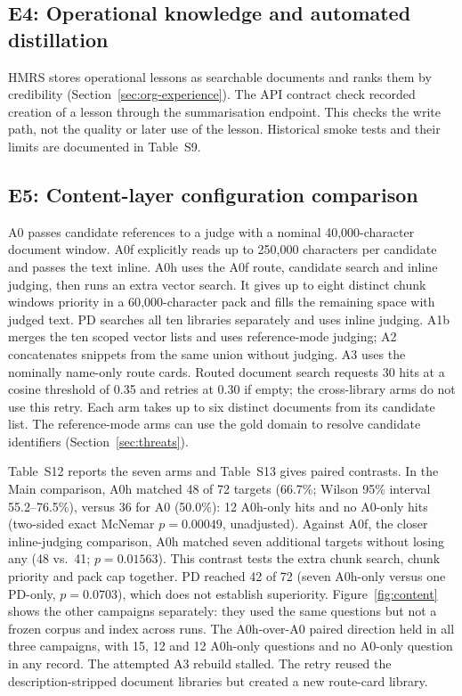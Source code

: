 \subsection{E4: Operational knowledge and automated distillation}
\label{sec:e3}
HMRS stores operational lessons as searchable documents and ranks them by
credibility (Section~\ref{sec:org-experience}). The API contract
check recorded creation of a lesson through the summarisation endpoint.
This checks the write path, not the quality or later use of the lesson.
Historical smoke tests and their limits are documented in Table~S9.

\subsection{E5: Content-layer configuration comparison}
\label{sec:ladder-opt}
A0 passes candidate references to a judge with a nominal
40{,}000-character document window. A0f explicitly reads up to 250{,}000
characters per candidate and passes the text inline. A0h uses the A0f
route, candidate search and inline judging, then runs an extra vector
search. It gives up to eight distinct chunk windows priority in a
60{,}000-character pack and fills the remaining space with judged text.
PD searches all ten libraries separately and uses inline judging. A1b
merges the ten scoped vector lists and uses reference-mode judging; A2
concatenates snippets from the same union without judging. A3 uses the
nominally name-only route cards. Routed document search requests 30 hits at
a cosine threshold of 0.35 and retries at 0.30 if empty; the cross-library
arms do not use this retry. Each arm takes up to six distinct documents
from its candidate list. The reference-mode arms can use the gold domain
to resolve candidate identifiers (Section~\ref{sec:threats}).

Table~S12 reports the seven arms and Table~S13 gives paired contrasts.
In the Main comparison, A0h matched 48 of 72 targets (66.7\%; Wilson 95\%
interval 55.2--76.5\%), versus 36 for A0 (50.0\%): 12 A0h-only hits and no
A0-only hits (two-sided exact McNemar $p=0.00049$, unadjusted). Against A0f,
the closer inline-judging comparison, A0h matched seven additional targets
without losing any (48 vs.\ 41; $p=0.01563$). This contrast tests the extra
chunk search, chunk priority and pack cap together. PD reached 42 of 72
(seven A0h-only versus one PD-only, $p=0.0703$), which does not establish
superiority. Figure~\ref{fig:content} shows the other campaigns separately:
they used the same questions but not a frozen corpus and index across runs.
The A0h-over-A0 paired direction held in all three campaigns, with 15, 12
and 12 A0h-only questions and no A0-only question in any record.
The attempted A3 rebuild stalled. The retry reused the description-stripped
document libraries but created a new route-card library.

